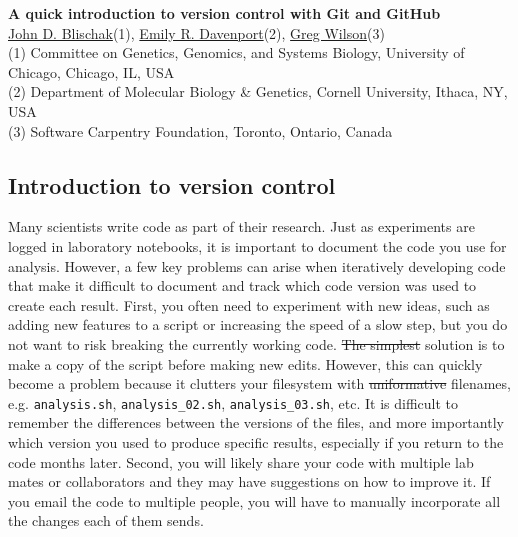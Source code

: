 \documentclass[10pt]{article}
\date{}
\providecommand{\DIFaddtex}[1]{{\protect\color{blue}\uwave{#1}}} %
\providecommand{\DIFdeltex}[1]{{\protect\color{red}\sout{#1}}}                      %
\providecommand{\DIFaddbegin}{} %
\providecommand{\DIFaddend}{} %
\providecommand{\DIFdelbegin}{} %
\providecommand{\DIFdelend}{} %
\providecommand{\DIFadd}[1]{\texorpdfstring{\DIFaddtex{#1}}{#1}} %
\providecommand{\DIFdel}[1]{\texorpdfstring{\DIFdeltex{#1}}{}} %
\begin{document}
\begin{flushleft}
{\LARGE
\textbf{A quick introduction to version control with Git and GitHub}
}
\\
\href{https://www.authorea.com/users/5990}{John D. Blischak}(1),
\href{https://www.authorea.com/users/16152}{Emily R. Davenport}(2),
\href{https://www.authorea.com/users/18131}{Greg Wilson}(3)\\

(1) Committee on Genetics, Genomics, and Systems Biology, University of
Chicago, Chicago, IL, USA\\(2) Department of Molecular Biology \&
Genetics, Cornell University, Ithaca, NY, USA\\(3) Software Carpentry
Foundation, Toronto, Ontario, Canada\\





\end{flushleft}





\subsection{Introduction to version control}

Many scientists write code as part of their research.
Just as experiments are logged in laboratory notebooks, it is important to document the code you use for analysis.
However, a few key problems can arise when iteratively developing code that make it difficult to document and track which code version was used to create each result.
First, you often need to experiment with new ideas, such as adding new features to a script or increasing the speed of a slow step, but you do not want to risk breaking the currently working code.
\DIFdelbegin \DIFdel{The simplest }\DIFdelend \DIFaddbegin \DIFadd{One often utilized }\DIFaddend solution is to make a copy of the script before making new edits.
However, this can quickly become a problem because it clutters your filesystem with \DIFdelbegin \DIFdel{uniformative }\DIFdelend \DIFaddbegin \DIFadd{uninformative }\DIFaddend filenames, e.g. \verb|analysis.sh|, \verb|analysis_02.sh|, \verb|analysis_03.sh|, etc.
It is difficult to remember the differences between the versions of the files, and more importantly which version you used to produce specific results, especially if you return to the code months later.
Second, you will likely share your code with multiple lab mates or collaborators and they may have suggestions on how to improve it.
If you email the code to multiple people, you will have to manually incorporate all the changes each of them sends.
\end{document}
